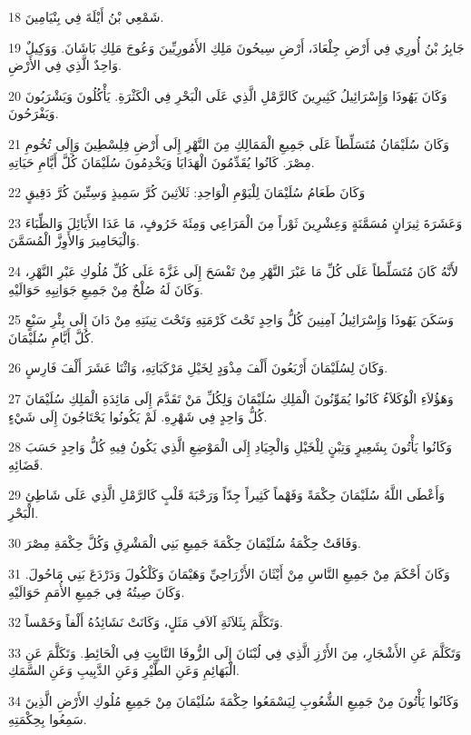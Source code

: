 \par 18 شَمْعِي بْنُ أَيْلَةَ فِي بِنْيَامِينَ.
\par 19 جَابِرُ بْنُ أُورِي فِي أَرْضِ جِلْعَادَ، أَرْضِ سِيحُونَ مَلِكِ الأَمُورِيِّينَ وَعُوجَ مَلِكِ بَاشَانَ. وَوَكِيلٌ وَاحِدٌ الَّذِي فِي الأَرْضِ.
\par 20 وَكَانَ يَهُوذَا وَإِسْرَائِيلُ كَثِيرِينَ كَالرَّمْلِ الَّذِي عَلَى الْبَحْرِ فِي الْكَثْرَةِ. يَأْكُلُونَ وَيَشْرَبُونَ وَيَفْرَحُونَ.
\par 21 وَكَانَ سُلَيْمَانُ مُتَسَلِّطاً عَلَى جَمِيعِ الْمَمَالِكِ مِنَ النَّهْرِ إِلَى أَرْضِ فِلِسْطِينَ وَإِلَى تُخُومِ مِصْرَ. كَانُوا يُقَدِّمُونَ الْهَدَايَا وَيَخْدِمُونَ سُلَيْمَانَ كُلَّ أَيَّامِ حَيَاتِهِ.
\par 22 وَكَانَ طَعَامُ سُلَيْمَانَ لِلْيَوْمِ الْوَاحِدِ: ثَلاَثِينَ كُرَّ سَمِيذٍ وَسِتِّينَ كُرَّ دَقِيقٍ
\par 23 وَعَشَرَةَ ثِيرَانٍ مُسَمَّنَةٍ وَعِشْرِينَ ثَوْراً مِنَ الْمَرَاعِي وَمِئَةَ خَرُوفٍ، مَا عَدَا الأَيَائِلَ وَالظِّبَاءَ وَالْيَحَامِيرَ وَالأَوِزَّ الْمُسَمَّنَ.
\par 24 لأَنَّهُ كَانَ مُتَسَلِّطاً عَلَى كُلِّ مَا عَبْرَ النَّهْرِ مِنْ تَفْسَحَ إِلَى غَزَّةَ عَلَى كُلِّ مُلُوكِ عَبْرِ النَّهْرِ، وَكَانَ لَهُ صُلْحٌ مِنْ جَمِيعِ جَوَانِبِهِ حَوَالَيْهِ.
\par 25 وَسَكَنَ يَهُوذَا وَإِسْرَائِيلُ آمِنِينَ كُلُّ وَاحِدٍ تَحْتَ كَرْمَتِهِ وَتَحْتَ تِينَتِهِ مِنْ دَانَ إِلَى بِئْرِ سَبْعٍ كُلَّ أَيَّامِ سُلَيْمَانَ.
\par 26 وَكَانَ لِسُلَيْمَانَ أَرْبَعُونَ أَلْفَ مِذْوَدٍ لِخَيْلِ مَرْكَبَاتِهِ، وَاثْنَا عَشَرَ أَلْفَ فَارِسٍ.
\par 27 وَهَؤُلاَءِ الْوُكَلاَءُ كَانُوا يُمَوِّنُونَ الْمَلِكِ سُلَيْمَانَ وَلِكُلِّ مَنْ تَقَدَّمَ إِلَى مَائِدَةِ الْمَلِكِ سُلَيْمَانَ كُلُّ وَاحِدٍ فِي شَهْرِهِ. لَمْ يَكُونُوا يَحْتَاجُونَ إِلَى شَيْءٍ.
\par 28 وَكَانُوا يَأْتُونَ بِشَعِيرٍ وَتِبْنٍ لِلْخَيْلِ وَالْجِيَادِ إِلَى الْمَوْضِعِ الَّذِي يَكُونُ فِيهِ كُلُّ وَاحِدٍ حَسَبَ قَضَائِهِ.
\par 29 وَأَعْطَى اللَّهُ سُلَيْمَانَ حِكْمَةً وَفَهْماً كَثِيراً جِدّاً وَرَحْبَةَ قَلْبٍ كَالرَّمْلِ الَّذِي عَلَى شَاطِئِ الْبَحْرِ.
\par 30 وَفَاقَتْ حِكْمَةُ سُلَيْمَانَ حِكْمَةَ جَمِيعِ بَنِي الْمَشْرِقِ وَكُلَّ حِكْمَةِ مِصْرَ.
\par 31 وَكَانَ أَحْكَمَ مِنْ جَمِيعِ النَّاسِ مِنْ أَيْثَانَ الأَزْرَاحِيِّ وَهَيْمَانَ وَكَلْكُولَ وَدَرْدَعَ بَنِي مَاحُولَ. وَكَانَ صِيتُهُ فِي جَمِيعِ الأُمَمِ حَوَالَيْهِ.
\par 32 وَتَكَلَّمَ بِثَلاَثَةِ آلاَفِ مَثَلٍ، وَكَانَتْ نَشَائِدُهُ أَلْفاً وَخَمْساً.
\par 33 وَتَكَلَّمَ عَنِ الأَشْجَارِ، مِنَ الأَرْزِ الَّذِي فِي لُبْنَانَ إِلَى الزُّوفَا النَّابِتِ فِي الْحَائِطِ. وَتَكَلَّمَ عَنِ الْبَهَائِمِ وَعَنِ الطَّيْرِ وَعَنِ الدَّبِيبِ وَعَنِ السَّمَكِ.
\par 34 وَكَانُوا يَأْتُونَ مِنْ جَمِيعِ الشُّعُوبِ لِيَسْمَعُوا حِكْمَةَ سُلَيْمَانَ مِنْ جَمِيعِ مُلُوكِ الأَرْضِ الَّذِينَ سَمِعُوا بِحِكْمَتِهِ.

